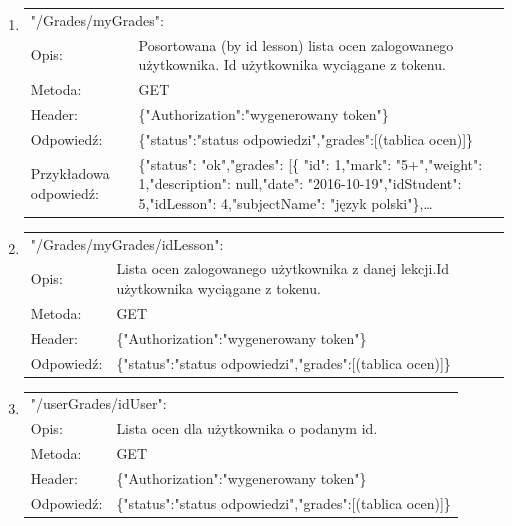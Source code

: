 \documentclass[12pt, titlepage]{article}
\begin{document}
\begin{enumerate}
	\item 
	{\renewcommand{\arraystretch}{1.5}
	\begin{tabular}[t]{p{3cm} p{15cm}}
	\multicolumn{2}{l}{"/Grades/myGrades":} \\
	Opis: &  Posortowana (by id lesson) lista ocen zalogowanego użytkownika. \newline Id użytkownika wyciągane z tokenu. \\
	Metoda: & GET \\
	Header: & \{"Authorization":"wygenerowany token"\} \\
	Odpowiedź: & \{"status":"status odpowiedzi",\newline "grades":[(tablica ocen)]\} \\
	Przykładowa \newline odpowiedź: & 			\{"status": "ok",\newline "grades": [\newline \{ "id": 1,\newline "mark": "5+",\newline "weight": 1,\newline "description": null,\newline "date": "2016-10-19",\newline "idStudent": 5,\newline "idLesson": 4,\newline "subjectName": "język polski"\},\newline \ldots
	\end{tabular}}
	
	\item 
	{\renewcommand{\arraystretch}{1.5}
	\begin{tabular}[t]{p{3cm} p{15cm}}
	\multicolumn{2}{l}{"/Grades/myGrades/{idLesson}":} \\
	Opis: &  Lista ocen zalogowanego użytkownika z danej lekcji.\newline Id użytkownika wyciągane z tokenu. \\
	Metoda: & GET \\
	Header: & \{"Authorization":"wygenerowany token"\} \\
	Odpowiedź: & \{"status":"status odpowiedzi",\newline "grades":[(tablica ocen)]\}
	\end{tabular}}
	
	\item 
	{\renewcommand{\arraystretch}{1.5}
	\begin{tabular}[t]{p{3cm} p{15cm}}
	\multicolumn{2}{l}{"/userGrades/{idUser}":} \\
	Opis: &  Lista ocen dla użytkownika o podanym id. \\
	Metoda: & GET \\
	Header: & \{"Authorization":"wygenerowany token"\} \\
	Odpowiedź: & \{"status":"status odpowiedzi",\newline "grades":[(tablica ocen)]\}
	\end{tabular}}
	

\end{enumerate}
\end{document}

